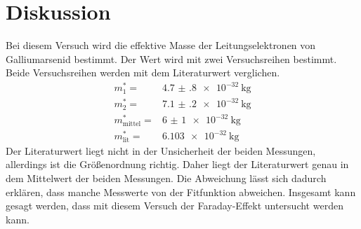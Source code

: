 \section{Diskussion}
\label{sec:Diskussion}
Bei diesem Versuch wird die effektive Masse der Leitungselektronen von Galliumarsenid bestimmt.
Der Wert wird mit zwei Versuchsreihen bestimmt. 
Beide Versuchsreihen werden mit dem Literaturwert \cite{LitWert} verglichen.
\begin{align*}
    m^*_1 =& \SI{4.7(8)e-32}{\kilo\gram}\\
    m^*_2 =& \SI{7.1(2)e-32}{\kilo\gram}\\
    m^*_{\text{mittel}}=&\SI{6(1)e-32}{\kilo\gram}\\
    m^*_{\text{lit}}=& \SI{6.103e-32}{\kilo\gram}
\end{align*}
Der Literaturwert liegt nicht in der Unsicherheit der beiden Messungen, allerdings ist die Größenordnung richtig.
Daher liegt der Literaturwert genau in dem Mittelwert der beiden Messungen.
Die Abweichung lässt sich dadurch erklären, dass manche Messwerte von der Fitfunktion abweichen. Insgesamt kann gesagt werden, 
dass mit diesem Versuch der Faraday-Effekt untersucht werden kann.
\newpage
